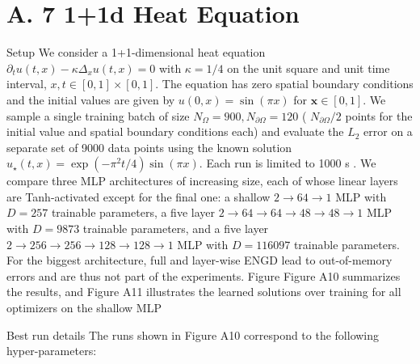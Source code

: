 \documentclass[10pt]{article}
\begin{document}
\section*{A. 7 1+1d Heat Equation}
Setup We consider a 1+1-dimensional heat equation $\partial_{t} u(t, x)-\kappa \Delta_{x} u(t, x)=0$ with $\kappa=1 / 4$ on the unit square and unit time interval, $x, t \in[0,1] \times[0,1]$. The equation has zero spatial boundary conditions and the initial values are given by $u(0, x)=\sin (\pi x)$ for $\boldsymbol{x} \in[0,1]$. We sample a single training batch of size $N_{\Omega}=900, N_{\partial \Omega}=120$ ( $N_{\partial \Omega} / 2$ points for the initial value and spatial boundary conditions each) and evaluate the $L_{2}$ error on a separate set of 9000 data points using the known solution $u_{\star}(t, x)=\exp \left(-\pi^{2} t / 4\right) \sin (\pi x)$. Each run is limited to 1000 s . We compare three MLP architectures of increasing size, each of whose linear layers are Tanh-activated except for the final one: a shallow $2 \rightarrow 64 \rightarrow 1$ MLP with $D=257$ trainable parameters, a five layer $2 \rightarrow 64 \rightarrow 64 \rightarrow 48 \rightarrow 48 \rightarrow 1$ MLP with $D=9873$ trainable parameters, and a five layer $2 \rightarrow 256 \rightarrow 256 \rightarrow 128 \rightarrow 128 \rightarrow 1$ MLP with $D=116097$ trainable parameters. For the biggest architecture, full and layer-wise ENGD lead to out-of-memory errors and are thus not part of the experiments. Figure Figure A10 summarizes the results, and Figure A11 illustrates the learned solutions over training for all optimizers on the shallow MLP

Best run details The runs shown in Figure A10 correspond to the following hyper-parameters:
\end{document}
